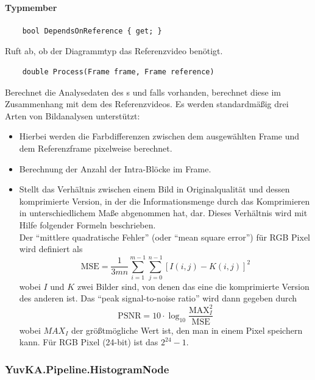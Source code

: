 \paragraph{Typmember}
\begin{itemize}

	\begin{verbatim}
	bool DependsOnReference { get; } 
	\end{verbatim}
	Ruft ab, ob der Diagrammtyp das Referenzvideo benötigt.
	
	\begin{verbatim}
	double Process(Frame frame, Frame reference)
	\end{verbatim}
	Berechnet die Analysedaten des s und falls vorhanden, berechnet diese im Zusammenhang mit dem  des Referenzvideos. Es werden standardmäßig drei Arten von Bildanalysen unterstützt:
		\begin{itemize}
			\item {} Hierbei werden die Farbdifferenzen zwischen dem ausgewählten Frame und dem Referenzframe pixelweise berechnet.
			\item {} Berechnung der Anzahl der Intra-Blöcke im Frame.
			\item {} Stellt das Verhältnis zwischen einem Bild in Originalqualität und dessen komprimierte Version, in der die Informationsmenge durch das Komprimieren in unterschiedlichem Maße abgenommen hat, dar. Dieses Verhältnis wird mit Hilfe folgender Formeln beschrieben. \\
			Der ``mittlere quadratische Fehler'' (oder ``mean square error'') für RGB Pixel wird definiert als 
			\[ \text{MSE} = \frac{1}{3mn} \sum_{i = 1}^{m - 1}{ \sum_{j = 0}^{n - 1}{[I(i, j) - K(i, j)]^2} } \]
			wobei $ I $ und $ K $ zwei Bilder sind, von denen das eine die komprimierte Version des anderen ist. Das ``peak signal-to-noise ratio'' wird dann gegeben durch
			\[ \text{PSNR} = 10 \cdot \log_{10}{\frac{\text{MAX}_I^2}{\text{MSE}}} \]
			wobei $ MAX_I $ der größtmögliche Wert ist, den man in einem Pixel speichern kann. Für RGB Pixel (24-bit) ist das $ 2^{24} - 1 $.
		\end{itemize}
		
\end{itemize}

\subsubsection{YuvKA.Pipeline.HistogramNode}

